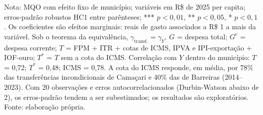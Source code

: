 \begin{table}[H]
\par\vspace{3pt}\parbox{\textwidth}{\scriptsize Nota: MQO com efeito fixo de município; variáveis em R\$ de 2025 per capita; erros-padrão robustos HC1 entre parênteses; *** $p<0{,}01$, ** $p<0{,}05$, * $p<0{,}1$. Os coeficientes são efeitos marginais: reais de gasto associados a R\$ 1 a mais da variável. Sob o teorema da equivalência, $\gamma_{\text{transf.}} = \gamma_Y$. $G$ = despesa total; $G^{c}$ = despesa corrente; $T$ = FPM + ITR + cotas de ICMS, IPVA e IPI-exportação + IOF-ouro; $T^{*}$ = $T$ sem a cota do ICMS. Correlação com $Y$ dentro do município: $T$ = 0,72; $T^{*}$ = 0,48; ICMS = 0,78. A cota do ICMS responde, em média, por 78\% das transferências incondicionais de Camaçari e 40\% das de Barreiras (2014--2023). Com 20 observações e erros autocorrelacionados (Durbin-Watson abaixo de 2), os erros-padrão tendem a ser subestimados; os resultados são exploratórios. Fonte: elaboração própria.}
\end{table}
